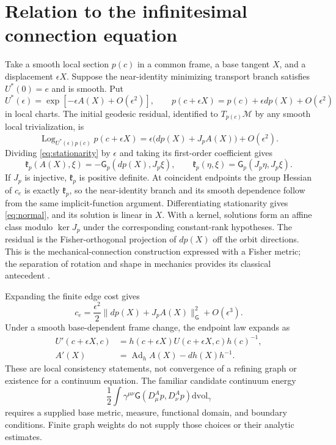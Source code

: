\documentclass[11pt]{article}
\DeclareMathOperator{\Log}{Log}
\DeclareMathOperator{\Ad}{Ad}
\newcommand{\M}{\mathcal M}
\newcommand{\G}{\mathsf G}
\begin{document}
\section{Relation to the infinitesimal connection equation}

Take a smooth local section $p(c)$ in a common frame, a base tangent $X$, and a displacement $\epsilon X$. Suppose the near-identity minimizing transport branch satisfies $U^*(0)=e$ and is smooth. Put
\begin{equation}
 U^*(\epsilon)=\exp[-\epsilon A(X)+O(\epsilon^2)],\qquad
 p(c+\epsilon X)=p(c)+\epsilon dp(X)+O(\epsilon^2)
\end{equation}
in local charts. The initial geodesic residual, identified to $T_{p(c)}\M$ by any smooth local trivialization, is
\begin{equation}
 \Log_{U^*(\epsilon)p(c)}p(c+\epsilon X)
 =\epsilon\bigl(dp(X)+J_pA(X)\bigr)+O(\epsilon^2).
\end{equation}
Dividing \eqref{eq:stationarity} by $\epsilon$ and taking its first-order coefficient gives
\begin{equation}
 \boxed{\mathfrak k_p(A(X),\xi)=-\G_p(dp(X),J_p\xi),\qquad
 \mathfrak k_p(\eta,\xi)=\G_p(J_p\eta,J_p\xi).}
 \label{eq:normal}
\end{equation}
If $J_p$ is injective, $\mathfrak k_p$ is positive definite. At coincident endpoints the group Hessian of $c_e$ is exactly $\mathfrak k_p$, so the near-identity branch and its smooth dependence follow from the same implicit-function argument. Differentiating stationarity gives \eqref{eq:normal}, and its solution is linear in $X$. With a kernel, solutions form an affine class modulo $\ker J_p$ under the corresponding constant-rank hypotheses. The residual is the Fisher-orthogonal projection of $dp(X)$ off the orbit directions. This is the mechanical-connection construction expressed with a Fisher metric; the separation of rotation and shape in mechanics provides its classical antecedent \cite{Littlejohn1997}.

Expanding the finite edge cost gives
\begin{equation}
 c_e=\frac{\epsilon^2}{2}\|dp(X)+J_pA(X)\|_\G^2+O(\epsilon^3).
\end{equation}
Under a smooth base-dependent frame change, the endpoint law expands as
\begin{align}
 U'(c+\epsilon X,c)&=h(c+\epsilon X)U(c+\epsilon X,c)h(c)^{-1},\\
 A'(X)&=\Ad_h A(X)-dh(X)h^{-1}.
\end{align}
These are local consistency statements, not convergence of a refining graph or existence for a continuum equation. The familiar candidate continuum energy
\begin{equation}
 \frac12\int\gamma^{\mu\nu}\G(D^A_\mu p,D^A_\nu p)\mathrm{dvol}_\gamma
\end{equation}
requires a supplied base metric, measure, functional domain, and boundary conditions. Finite graph weights do not supply those choices or their analytic estimates.
\end{document}

